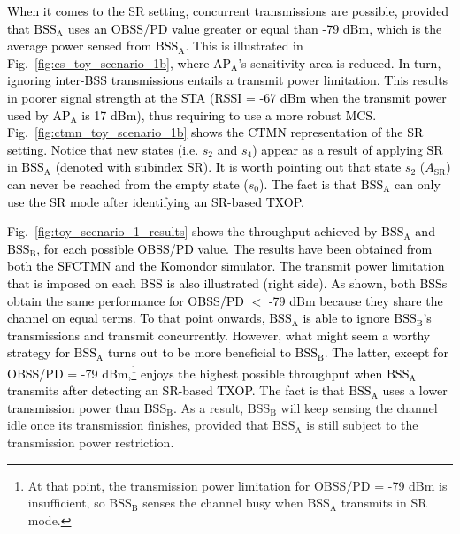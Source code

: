 \documentclass{ieeeaccess}
\begin{document}
\textcolor{black}{When it comes to the SR setting, concurrent transmissions are possible, provided that $\text{BSS}_\text{A}$ uses an OBSS/PD value greater or equal than -79 dBm, which is the average power sensed from $\text{BSS}_\text{A}$. This is illustrated in Fig.~\ref{fig:cs_toy_scenario_1b}, where $\text{AP}_\text{A}$'s sensitivity area is reduced. In turn, ignoring inter-BSS transmissions entails a transmit power limitation. This results in poorer signal strength at the STA (RSSI = -67 dBm when the transmit power used by AP$_\text{A}$ is 17 dBm), thus requiring to use a more robust MCS. Fig.~\ref{fig:ctmn_toy_scenario_1b} shows the CTMN representation of the SR setting. Notice that new states (i.e. $s_2$ and $s_4$) appear as a result of applying SR in $\text{BSS}_\text{A}$ (denoted with subindex $\text{SR}$). It is worth pointing out that state $s_2$ ($A_\text{SR}$) can never be reached from the empty state ($s_0$). The fact is that $\text{BSS}_\text{A}$ can only use the SR mode after identifying an SR-based TXOP.}

\textcolor{black}{Fig.~\ref{fig:toy_scenario_1_results} shows the throughput achieved by $\text{BSS}_\text{A}$ and $\text{BSS}_\text{B}$, for each possible OBSS/PD value. The results have been obtained from both the SFCTMN and the Komondor simulator. The transmit power limitation that is imposed on each BSS is also illustrated (right side). As shown, both BSSs obtain the same performance for OBSS/PD $<$ -79 dBm because they share the channel on equal terms. To that point onwards, $\text{BSS}_\text{A}$ is able to ignore $\text{BSS}_\text{B}$'s transmissions and transmit concurrently. However, what might seem a worthy strategy for $\text{BSS}_\text{A}$ turns out to be more beneficial to $\text{BSS}_\text{B}$. The latter, except for OBSS/PD = -79 dBm,\footnote{At that point, the transmission power limitation for OBSS/PD = -79 dBm is insufficient, so $\text{BSS}_\text{B}$ senses the channel busy when $\text{BSS}_\text{A}$ transmits in SR mode.} enjoys the highest possible throughput when $\text{BSS}_\text{A}$ transmits after detecting an SR-based TXOP. The fact is that $\text{BSS}_\text{A}$ uses a lower transmission power than $\text{BSS}_\text{B}$.} As a result, $\text{BSS}_\text{B}$ will keep sensing the channel idle once its transmission finishes, provided that $\text{BSS}_\text{A}$ is still subject to the transmission power restriction.
\end{document}
